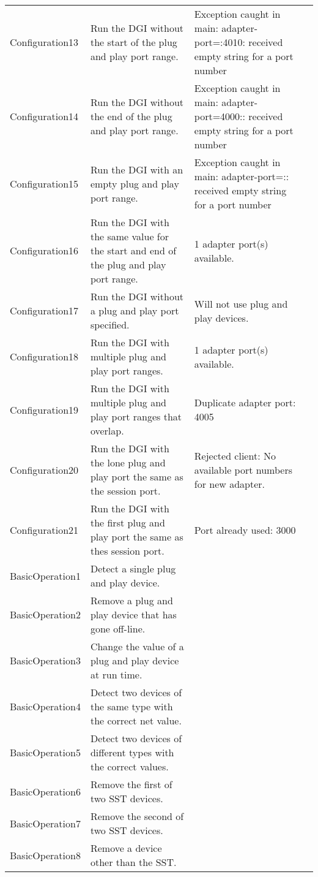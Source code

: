 \documentclass{article}
\begin{document}
\begin{center}
\begin{footnotesize}
\begin{longtable}{|p{3cm}|p{4cm}|p{8cm}|c|}
    Configuration13 & Run the DGI without the start of the plug and play port range. & Exception caught in main: adapter-port=:4010: received empty string for a port number & \\
    Configuration14 & Run the DGI without the end of the plug and play port range. & Exception caught in main: adapter-port=4000:: received empty string for a port number & \\
    Configuration15 & Run the DGI with an empty plug and play port range. & Exception caught in main: adapter-port=:: received empty string for a port number & \\
    Configuration16 & Run the DGI with the same value for the start and end of the plug and play port range. & 1 adapter port(s) available. & \\
    Configuration17 & Run the DGI without a plug and play port specified. & Will not use plug and play devices. & \\
    Configuration18 & Run the DGI with multiple plug and play port ranges. & 1 adapter port(s) available. & \\
    Configuration19 & Run the DGI with multiple plug and play port ranges that overlap. & Duplicate adapter port: 4005 & \\
    Configuration20 & Run the DGI with the lone plug and play port the same as the session port. & Rejected client: No available port numbers for new adapter. & \\
    Configuration21 & Run the DGI with the first plug and play port the same as thes session port. & Port already used: 3000 & \\
    BasicOperation1 & Detect a single plug and play device. & & \\
    BasicOperation2 & Remove a plug and play device that has gone off-line. & & \\
    BasicOperation3 & Change the value of a plug and play device at run time. & & \\
    BasicOperation4 & Detect two devices of the same type with the correct net value. & & \\
    BasicOperation5 & Detect two devices of different types with the correct values. & & \\
    BasicOperation6 & Remove the first of two SST devices. & & \\
    BasicOperation7 & Remove the second of two SST devices. & & \\
    BasicOperation8 & Remove a device other than the SST. & & \\

\end{longtable}
\end{footnotesize}
\end{center}
\end{document}

